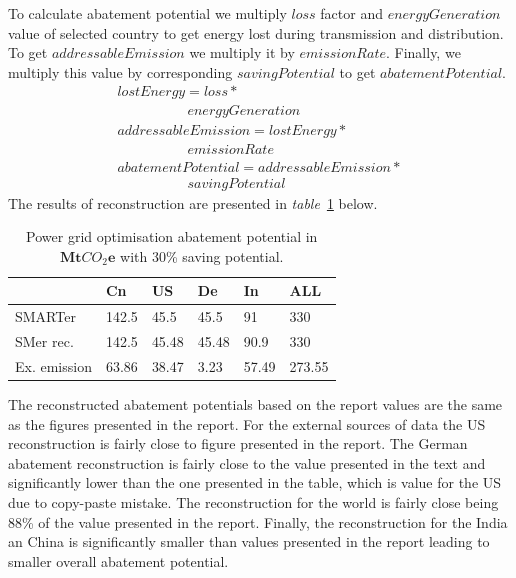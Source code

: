 \documentclass[11pt, twocolumn]{article}
\begin{document}
To calculate abatement potential we multiply $loss$ factor and $energyGeneration$ value of selected country to get energy lost during transmission and distribution. To get $addressableEmission$ we multiply it by $emissionRate$. Finally, we multiply this value by corresponding $savingPotential$ to get $abatementPotential$.
\begin{gather*}
  lostEnergy = loss *\\
  \quad\quad\quad\quad\quad energyGeneration\\
  addressableEmission = lostEnergy *\\
  \quad\quad\quad\quad\quad emissionRate\\
  abatementPotential = addressableEmission *\\
  \quad\quad\quad\quad\quad savingPotential
\end{gather*}
The results of reconstruction are presented in \emph{table}~\ref{tab:pgo} below.
\begin{center}
  \begin{table}[h]
    \begin{tabular}{ p{} | p{} | p{} | p{} | p{} | p{} }
       & Cn & US & De & In & ALL \\
      \hline
      SMARTer & 142.5 & 45.5 & 45.5 & 91 & 330 \\
      SMer rec. & 142.5 & 45.48 & 45.48 & 90.9 & 330 \\
      Ex. emission & 63.86 & 38.47 & 3.23 & 57.49 & 273.55
    \end{tabular}
    \caption{Power grid optimisation abatement potential in $\mathbf{Mt}CO_2\mathbf{e}$ with 30\% saving potential. \label{tab:pgo}}
  \end{table}
\end{center}
The reconstructed abatement potentials based on the report values are the same as the figures presented in the report. For the external sources of data the US reconstruction is fairly close to figure presented in the report. The German abatement reconstruction is fairly close to the value presented in the text and significantly lower than the one presented in the table, which is value for the US due to copy-paste mistake. The reconstruction for the world is fairly close being 88\% of the value presented in the report. Finally, the reconstruction for the India an China is significantly smaller than values presented in the report leading to smaller overall abatement potential.
\end{document}
